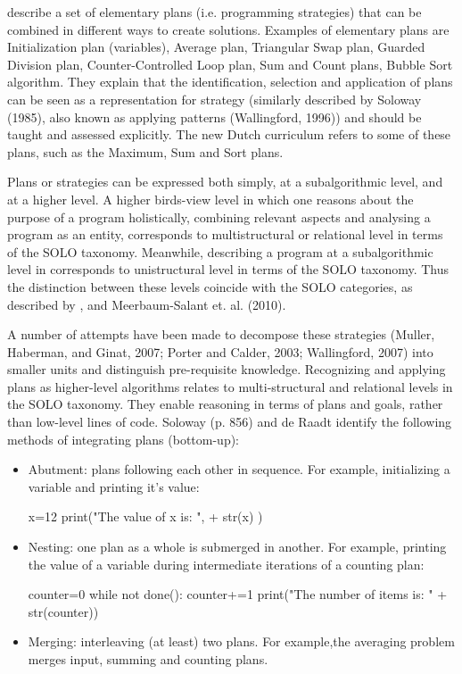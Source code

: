   describe a set of elementary plans (i.e. programming strategies) that can be combined in different ways to create solutions. Examples of elementary plans are Initialization plan (variables), Average plan, Triangular Swap plan, Guarded Division plan, Counter-Controlled Loop plan, Sum and Count plans, Bubble Sort algorithm. They explain that the identification, selection and application of plans can be seen as a representation for strategy (similarly described by Soloway (1985), also known as applying patterns (Wallingford, 1996)) and should be taught and assessed explicitly. The new Dutch curriculum \cite{Barendsen2016} refers to some of these plans, such as the Maximum, Sum and Sort plans.

Plans or strategies can be expressed both simply, at a subalgorithmic level, and at a higher level\cite{deRaadt2006}. A higher birds-view level in which one reasons about the purpose of a program holistically, combining relevant aspects and analysing a program as an entity, corresponds to multistructural or relational level in terms of the SOLO taxonomy\cite{Smetsers2017}. Meanwhile, describing a program at a subalgorithmic level in corresponds to unistructural level in terms of the SOLO taxonomy. Thus the distinction between these levels coincide with the SOLO categories, as described by ,  and Meerbaum-Salant et. al. (2010).

A number of attempts have been made to decompose these strategies (Muller, Haberman, and Ginat, 2007; Porter and Calder, 2003; Wallingford, 2007) into smaller units and distinguish pre-requisite knowledge. Recognizing and applying plans as higher-level algorithms relates to multi-structural and relational levels in the SOLO taxonomy. They enable reasoning in terms of plans and goals, rather than low-level lines of code. Soloway (p. 856) and de Raadt identify the following methods of integrating plans (bottom-up):
\begin{itemize}
\item Abutment: plans following each other in sequence. For example, initializing a variable and printing it’s value:
\begin{PYTHON}
x=12
print("The value of x is: ", + str(x) )
\end{PYTHON}


\item Nesting: one plan as a whole is submerged in another. For example, printing the value of a variable during intermediate iterations of a counting plan:
\begin{PYTHON}
counter=0
while not done():
    counter+=1
    print("The number of items is: " + str(counter))
\end{PYTHON}

\item Merging: interleaving (at least) two plans. For example,the averaging problem merges input, summing and counting plans.
\end{itemize}

